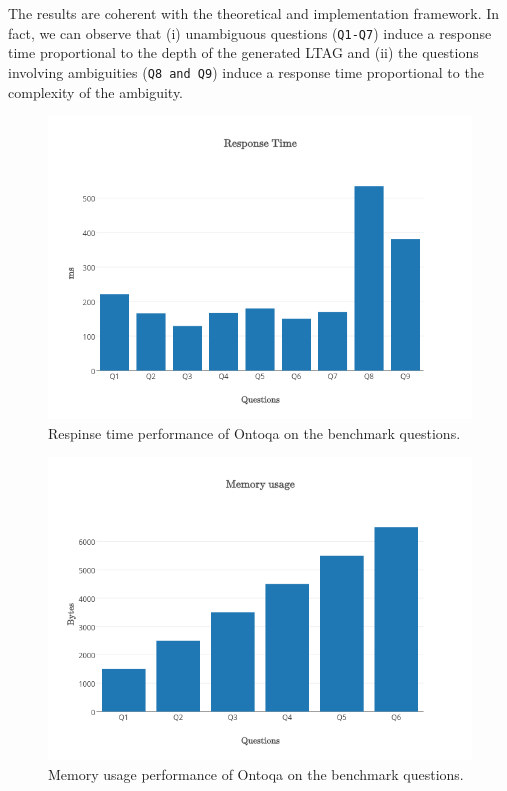 The results are coherent with the theoretical and implementation framework. In fact, we can observe that (i) unambiguous questions (\texttt{Q1-Q7}) induce a response time proportional to the depth of the generated LTAG and (ii) the questions involving ambiguities (\texttt{Q8 and Q9}) induce a response time proportional to the complexity of the ambiguity.

\begin{figure}[H]
	\centering
	\includegraphics[width=0.8\columnwidth]{./fig/evaluation-response-time}
	\caption{Respinse time performance of Ontoqa on the benchmark questions.}
	\label{fig:evaluation-time}
\end{figure}

\begin{figure}[H]
	\centering
	\includegraphics[width=0.8\columnwidth]{./fig/evaluation-memory-usage}
	\caption{Memory usage performance of Ontoqa on the benchmark questions.}
	\label{fig:evaluation-memory}
\end{figure}